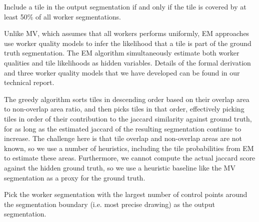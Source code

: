 \par \noindent Include a tile in the output segmentation if and only if the tile is covered by at least 50\% of all worker segmentations.

\par \noindent Unlike MV, which assumes that all workers performs uniformly, EM approaches use worker quality models to infer the likelihood that a tile is part of the ground truth segmentation. The EM algorithm simultaneously estimate both worker qualities and tile likelihoods as hidden variables. Details of the formal derivation and three worker quality models that we have developed can be found in our technical report.

\par \noindent The greedy algorithm sorts tiles in descending order based on their overlap area to non-overlap area ratio, and then picks tiles in that order, effectively picking tiles in order of their contribution to the jaccard similarity against ground truth, for as long as the estimated jaccard of the resulting segmentation continue to increase. The challenge here is that tile overlap and non-overlap areas are not known, so we use a number of heuristics, including the tile probabilities from EM to estimate these areas. Furthermore, we cannot compute the actual jaccard score against the hidden ground truth, so we use a heuristic baseline like the MV segmentation as a proxy for the ground truth.

\par \noindent Pick the worker segmentation with the largest number of control points around the segmentation boundary (i.e. most precise drawing) as the output segmentation.